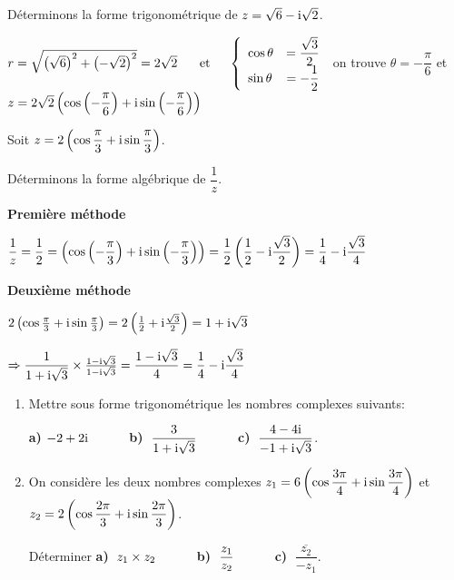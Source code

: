 \medskip


  \begin{example} Déterminons la forme trigonométrique  de $ z=\sqrt{6}-\text{i}\sqrt{2} $.
  
  \medskip
  $ r=\sqrt{\left(\sqrt{6}\right)^2+\left(-\sqrt{2}\right)^2}=2\sqrt{2}   \hspace*{0.5cm} \text{ et}  \hspace*{0.5cm}   \left\{\begin{array}{l c l}
\cos \theta & = \dfrac{\sqrt{3}}{2} \\	 
\sin \theta & =- \dfrac{1}{2}
\end{array}\right. $  on trouve $ \theta=-\dfrac{\pi}{6} $  et $ z=2\sqrt{2}\left(\cos \left(-\dfrac{\pi}{6}\right) +\text{i} \sin \left(-\dfrac{\pi}{6}\right)\right)$
   \end{example}
   \begin{example}
  Soit  $ z=2\left(\cos\dfrac{\pi}{3} +\text{i} \sin \dfrac{\pi}{3}\right)$.
  
   Déterminons la forme algébrique  de  $ \dfrac{1}{z} $.
  
  \medskip
  
  \textbf{Première méthode}
  
   \medskip
  $ \dfrac{1}{z} =\dfrac{1}{2}=\left(\cos \left(-\dfrac{\pi}{3}\right) +\text{i} \sin \left(-\dfrac{\pi}{3}\right)\right)=\dfrac{1}{2}\left(\dfrac{1}{2}-\text{i}\dfrac{\sqrt{3}}{2}\right)=\dfrac{1}{4}-\text{i}\dfrac{\sqrt{3}}{4}$
  
  \medskip
  
  \textbf{Deuxième méthode}
  
   \medskip
  $ 2\left(\cos\frac{\pi}{3} +\text{i} \sin \frac{\pi}{3}\right)=2\left(\frac{1}{2}+\text{i}\frac{\sqrt{3}}{2}\right)=1+\text{i}\sqrt{3}$
  
  
   \medskip
   $ \Rightarrow\dfrac{1}{1+\text{i}\sqrt{3}}\times\frac{1-\text{i}\sqrt{3}}{1-\text{i}\sqrt{3}} =\dfrac{1-\text{i}\sqrt{3}}{4}=\dfrac{1}{4}-\text{i}\dfrac{\sqrt{3}}{4}$
    \end{example}
\begin{exercice}
\begin{enumerate}
\item Mettre sous forme trigonométrique les nombres complexes suivants:


\medskip

\textbf{a)}\;  $ -2+2\text{i} \hspace*{1cm}$ \textbf{b)}  $\; \dfrac{3}{1+\text{i}\sqrt{3}}  \hspace*{1cm}$ \textbf{c)}  $\; \dfrac{4-4\text{i}}{-1+\text{i}\sqrt{3}} $.
\item  On considère les deux nombres complexes \; $ z_1=6\left(\cos\dfrac{3\pi}{4} +\text{i} \sin \dfrac{3\pi}{4}\right) $ et $ z_2=2\left(\cos\dfrac{2\pi}{3} +\text{i} \sin \dfrac{2\pi}{3}\right) $.

\bigskip

Déterminer   \textbf{a)}  $\; z_1\times z_2 \hspace*{1cm}$ \textbf{b)}  $\; \dfrac{z_1}{z_2} \hspace*{1cm}$  \textbf{c)}  $\; \dfrac{\overline{z_2}}{-z_1} $.
\end{enumerate}
\end{exercice}
